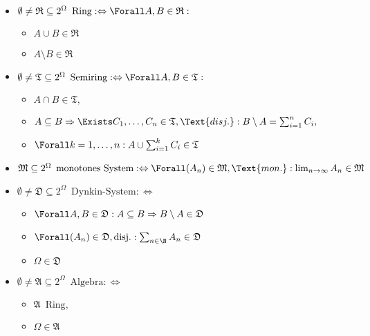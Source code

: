 \begin{solution}

\phantom{}

\begin{itemize}

  \item $\emptyset \neq \mathfrak{R} \subseteq 2^\Omega \enspace \text{Ring} : \Leftrightarrow \Forall A, B \in \mathfrak{R}:$
  \begin{itemize}
    \item $A \cup B \in \mathfrak{R}$
    \item $A \setminus B \in \mathfrak{R}$
  \end{itemize}

  \item $\emptyset \neq \mathfrak{T} \subseteq 2^\Omega \enspace \text{Semiring} : \Leftrightarrow \Forall A, B \in \mathfrak{T}:$
  \begin{itemize}
    \item $A \cap B \in \mathfrak{T},$
    \item $A \subseteq B \Rightarrow \Exists C_1, \ldots, C_n \in \mathfrak{T}, \Text{disj.}:
    B \setminus A = \sum_{i=1}^n C_i,$
    \item $\Forall k = 1, \ldots, n:
    A \cup \sum_{i=1}^k C_i \in \mathfrak{T}$
  \end{itemize}

  \item $\mathfrak{M} \subseteq 2^\Omega \enspace \text{monotones System} : \Leftrightarrow \Forall (A_n) \in \mathfrak{M}, \Text{mon.}: \lim_{n \to \infty} A_n \in \mathfrak{M}$

  \item $\emptyset \neq \mathfrak{D} \subseteq 2^\Omega \enspace \text{Dynkin-System} : \Leftrightarrow$
  \begin{itemize}
    \item $\Forall A, B \in \mathfrak{D}:
    A \subseteq B \Rightarrow B \setminus A \in \mathfrak{D}$
    \item $\Forall (A_n) \in \mathfrak{D}, \text{disj.}: \sum_{n \in \N} A_n \in \mathfrak{D}$
    \item $\Omega \in \mathfrak{D}$
  \end{itemize}

  \item $\emptyset \neq \mathfrak{A} \subseteq 2^\Omega \enspace \text{Algebra} : \Leftrightarrow$
  \begin{itemize}
    \item $\mathfrak{A} \enspace \text{Ring},$
    \item $\Omega \in \mathfrak{A}$
  \end{itemize}


\end{itemize}
\end{solution}

